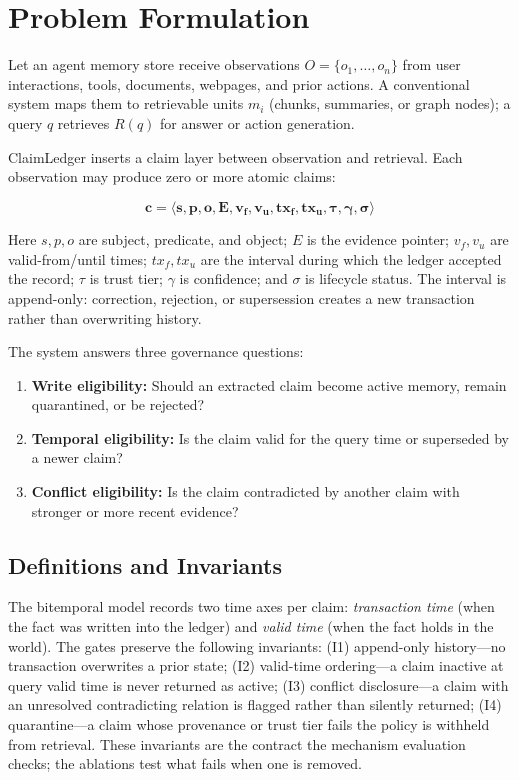 \section{Problem Formulation}\label{sec:problem-formulation}

Let an agent memory store receive observations $O = \{o_1,\ldots,o_n\}$ from user interactions, tools, documents, webpages, and prior actions. A conventional system maps them to retrievable units $m_i$ (chunks, summaries, or graph nodes); a query $q$ retrieves $R(q)$ for answer or action generation.

ClaimLedger inserts a claim layer between observation and retrieval. Each observation may produce zero or more atomic claims:

\[
\boldsymbol{c = \langle s,p,o,E,v_f,v_u,tx_f,tx_u,\tau,\gamma,\sigma \rangle}
\]

Here $s,p,o$ are subject, predicate, and object; $E$ is the evidence pointer; $v_f,v_u$ are valid-from/until times; $tx_f,tx_u$ are the interval during which the ledger accepted the record; $\tau$ is trust tier; $\gamma$ is confidence; and $\sigma$ is lifecycle status. The interval is append-only: correction, rejection, or supersession creates a new transaction rather than overwriting history.

The system answers three governance questions:

\begin{enumerate}
\item \textbf{Write eligibility:} Should an extracted claim become active memory, remain quarantined, or be rejected?
\item \textbf{Temporal eligibility:} Is the claim valid for the query time or superseded by a newer claim?
\item \textbf{Conflict eligibility:} Is the claim contradicted by another claim with stronger or more recent evidence?
\end{enumerate}

\subsection{Definitions and Invariants}\label{sec:definitions-invariants}

The bitemporal model records two time axes per claim: \textit{transaction time} (when the fact was written into the ledger) and \textit{valid time} (when the fact holds in the world). The gates preserve the following invariants: (I1) append-only history---no transaction overwrites a prior state; (I2) valid-time ordering---a claim inactive at query valid time is never returned as active; (I3) conflict disclosure---a claim with an unresolved contradicting relation is flagged rather than silently returned; (I4) quarantine---a claim whose provenance or trust tier fails the policy is withheld from retrieval. These invariants are the contract the mechanism evaluation checks; the ablations test what fails when one is removed.

